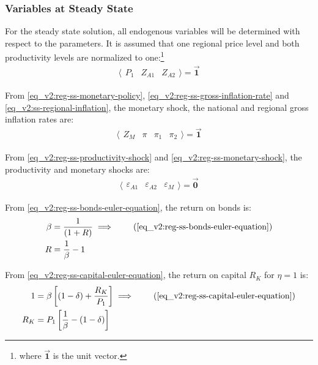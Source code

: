 \documentclass[../thesis.tex]{subfiles}
\begin{document}

\subsubsection{Variables at Steady State}

	For the steady state solution, all endogenous variables will be determined with respect to the parameters. It is assumed that one regional price level and both productivity levels are normalized to one:\footnote{where $\vec{\bm{1}}$ is the unit vector.}
	\begin{align}
		\langle \begin{matrix} P_{1} & Z_{A1} & Z_{A2} \end{matrix} \rangle = \vec{\bm{1}} \label{eq_v2:reg-ss-p1-za1}
	\end{align}
	
	From \ref{eq_v2:reg-ss-monetary-policy}, \ref{eq_v2:reg-ss-gross-inflation-rate} and \ref{eq_v2:ss-regional-inflation}, the monetary shock, the national and regional gross inflation rates are:
	\begin{align}
		\langle \begin{matrix} Z_{M} & \pi & \pi_{1} & \pi_{2} \end{matrix} \rangle  = \vec{\bm{1}}
	\end{align}
	
	From \ref{eq_v2:reg-ss-productivity-shock} and \ref{eq_v2:reg-ss-monetary-shock}, the productivity and monetary shocks are:
	\begin{align}
		\langle \begin{matrix} \varepsilon_{A1} & \varepsilon_{A2} & \varepsilon_{M} \end{matrix} \rangle = \vec{\bm{0}} \label{eq_v2:reg-ss-epsilon}
	\end{align}
	
	From \ref{eq_v2:reg-ss-bonds-euler-equation}, the return on bonds is:
	\begin{align}
		\beta &= \frac{1}{(1 + R)} \implies \tag{\ref{eq_v2:reg-ss-bonds-euler-equation}} \\
		R &= \frac{1}{\beta} - 1 \label{eq_v2:reg-ss-R}
	\end{align}
	
	From \ref{eq_v2:reg-ss-capital-euler-equation}, the return on capital $R_K$ for $\eta = 1$ is:
	\begin{align}
		1 &= \beta \left[ (1-\delta) + \frac{R_K}{P_{1}} \right] \implies \tag{\ref{eq_v2:reg-ss-capital-euler-equation}} \\
		R_K &= P_{1} \left[ \frac{1}{\beta} - (1-\delta) \right] \label{eq_v2:reg-ss-RK}
	\end{align}
\end{document}
